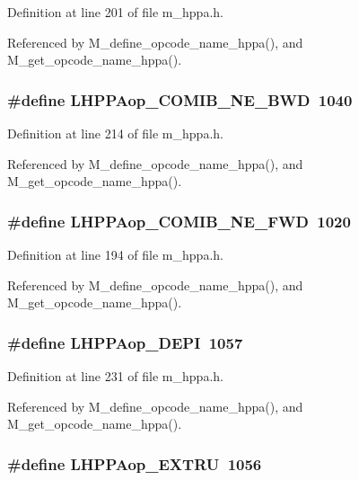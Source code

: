 Definition at line 201 of file m\_\-hppa.h.

Referenced by M\_\-define\_\-opcode\_\-name\_\-hppa(), and M\_\-get\_\-opcode\_\-name\_\-hppa().
\subsubsection{\setlength{\rightskip}{0pt plus 5cm}\#define LHPPAop\_\-COMIB\_\-NE\_\-BWD~1040}\label{m__hppa_8h_1276c44ff00f3ecc06191347fe998588}




Definition at line 214 of file m\_\-hppa.h.

Referenced by M\_\-define\_\-opcode\_\-name\_\-hppa(), and M\_\-get\_\-opcode\_\-name\_\-hppa().
\subsubsection{\setlength{\rightskip}{0pt plus 5cm}\#define LHPPAop\_\-COMIB\_\-NE\_\-FWD~1020}\label{m__hppa_8h_042c1f6ccf4a80f4f80084d2f00d4bdb}




Definition at line 194 of file m\_\-hppa.h.

Referenced by M\_\-define\_\-opcode\_\-name\_\-hppa(), and M\_\-get\_\-opcode\_\-name\_\-hppa().
\subsubsection{\setlength{\rightskip}{0pt plus 5cm}\#define LHPPAop\_\-DEPI~1057}\label{m__hppa_8h_3de46736e3ce5ae370ab47353fe21fd9}




Definition at line 231 of file m\_\-hppa.h.

Referenced by M\_\-define\_\-opcode\_\-name\_\-hppa(), and M\_\-get\_\-opcode\_\-name\_\-hppa().
\subsubsection{\setlength{\rightskip}{0pt plus 5cm}\#define LHPPAop\_\-EXTRU~1056}\label{m__hppa_8h_71b35d6fd35cac77cb36f9a63b8769b0}




